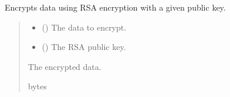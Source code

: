 \documentclass[letterpaper,10pt,english]{sphinxmanual}
\begin{document}
\begin{fulllineitems}
\label{\detokenize{encryption:encryption.encrypt_rsa}}
\pysigstartsignatures
{}
\pysigstopsignatures
\sphinxAtStartPar
Encrypts data using RSA encryption with a given public key.
\begin{quote}\begin{description}
\begin{itemize}
\item {} 
\sphinxAtStartPar
{} () \textendash{} The data to encrypt.

\item {} 
\sphinxAtStartPar
{} () \textendash{} The RSA public key.

\end{itemize}

\sphinxAtStartPar
The encrypted data.

\sphinxAtStartPar
bytes

\end{description}\end{quote}

\end{fulllineitems}

\end{document}
